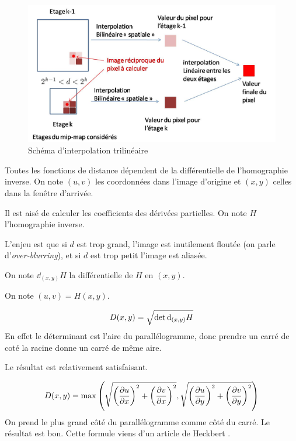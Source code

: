 \begin{figure}[h!]
\centering
\caption{Schéma d'interpolation trilinéaire}
\includegraphics[scale=0.5]{intertrilineaire.jpg}
\end{figure}


Toutes les fonctions de distance dépendent de la différentielle de l'homographie inverse.
On note $(u,v)$ les coordonnées dans l'image d'origine et $(x,y)$ celles dans la fenêtre d'arrivée.

Il est aisé de calculer les coefficients des dérivées partielles. On note $H$ l'homographie inverse.


L'enjeu est que si $d$ est trop grand, l'image est inutilement floutée (on parle d'\emph{over-blurring}), et si $d$ est trop petit l'image est aliasée.


On note $\dd_{(x,y)} H$ la différentielle de $H$ en $(x,y)$.

On note $(u,v)=H(x,y)$.

$$D(x,y) = \sqrt{\det \textrm{d}_{(x,y)} H}$$
En effet le déterminant est l'aire du parallélogramme, donc prendre un carré de coté la racine donne un carré de même aire.

Le résultat est relativement satisfaisant.


$$ D(x,y) = \max \left(\sqrt{\left(\frac{\partial u}{\partial x}\right)^2 + \left(\frac{\partial v}{\partial x}\right)^2},\sqrt{\left(\frac{\partial u}{\partial y}\right)^2 + \left(\frac{\partial v}{\partial y}\right)^2}\right)$$
On prend le plus grand côté du parallélogramme comme côté du carré. Le résultat est bon. Cette formule viens d'un article de Heckbert \cite{heckbert1983texture}.


